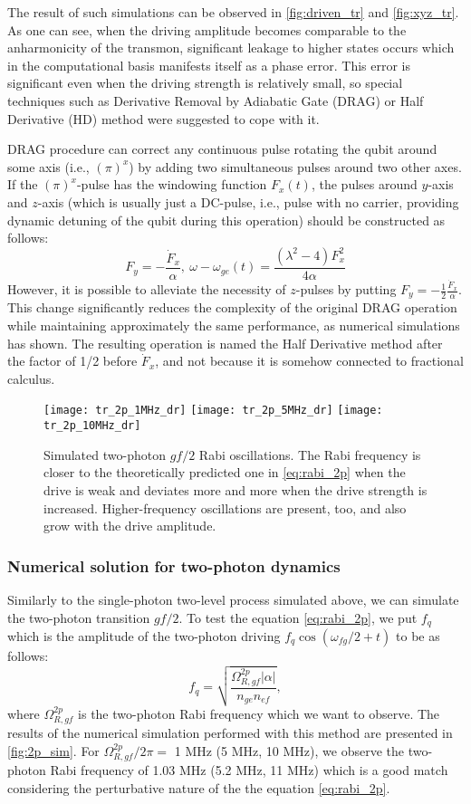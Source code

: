 The result of such simulations can be observed in \autoref{fig:driven_tr} and \autoref{fig:xyz_tr}. As one can see, when the driving amplitude becomes comparable to the anharmonicity of the transmon, significant leakage to higher states occurs which in the computational basis manifests itself as a phase error. This error is significant even when the driving strength is relatively small, so special techniques such as Derivative Removal by Adiabatic Gate\cite{Motzoi2009,Chow2010} (DRAG) or Half Derivative\cite{Lucero2010} (HD) method were suggested to cope with it.

DRAG procedure can correct any continuous pulse rotating the qubit around some axis (i.e., $(\pi)^x$) by adding two simultaneous pulses around two other axes. If the  $(\pi)^x$-pulse has the windowing function $F_x(t)$, the pulses around $y$-axis and $z$-axis (which is usually just a DC-pulse, i.e., pulse with no carrier, providing dynamic detuning of the qubit during this operation) should be constructed as follows:
\[
F_y = -\frac{\dot F_x}{\alpha},\ \omega-\omega_{ge}(t) = \frac{(\lambda^2-4)F_x^2}{4\alpha}
\]
However, it is possible to alleviate the necessity of $z$-pulses by putting $F_y=-\frac{1}{2}\frac{\dot F_x}{\alpha}$. This change significantly reduces the complexity of the original DRAG operation while maintaining approximately the same performance, as numerical simulations has shown\cite{Lucero2010}. The resulting operation is named the Half Derivative method after the factor of 1/2 before $\dot F_x$, and not because it is somehow connected to fractional calculus.

\begin{figure}
\centering
\texttt{[image: tr\_2p\_1MHz\_dr]} \texttt{[image: tr\_2p\_5MHz\_dr]} \texttt{[image: tr\_2p\_10MHz\_dr]}
\caption{Simulated two-photon $gf/2$ Rabi oscillations. The Rabi frequency is closer to the theoretically predicted one in \eqref{eq:rabi_2p} when the drive is weak and deviates more and more when the drive strength is increased. Higher-frequency oscillations are present, too, and also grow with the drive amplitude.}
\label{fig:2p_sim}
\end{figure}

\subsubsection{Numerical solution for two-photon dynamics}

Similarly to the single-photon two-level process simulated above, we can simulate the two-photon transition $gf/2$. To test the equation \eqref{eq:rabi_2p}, we put $f_q$ which is the amplitude of the two-photon driving $f_q \cos(\omega_{fg}/2+t)$ to be as follows:
\[
f_q = \sqrt{\frac{\Omega_{R,gf}^{2p} |\alpha|}{n_{ge}n_{ef}}},
\]
where $\Omega_{R,gf}^{2p}$ is the two-photon Rabi frequency which we want to observe. The results of the numerical simulation performed with this method are presented in \autoref{fig:2p_sim}. For $\Omega_{R,gf}^{2p}/2\pi =$ 1 MHz (5 MHz, 10 MHz), we observe the two-photon Rabi frequency of 1.03 MHz (5.2 MHz, 11 MHz) which is a good match considering the perturbative nature of the the equation \eqref{eq:rabi_2p}. 

